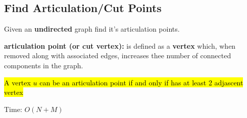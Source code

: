 \subsection{Find Articulation/Cut Points}

Given an \textbf{undirected} graph find it's articulation points.

\textbf{articulation point (or cut vertex):} is defined as a \textbf{vertex} which, when removed along with associated edges, increases thee number of connected components in the graph.

\hl{A vertex $u$ can be an articulation point if and only if has at least 2 adjascent vertex}

Time: $O(N+M)$
